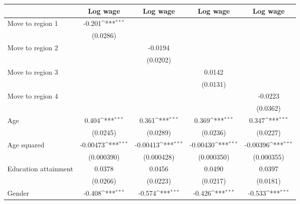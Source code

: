 {
\def\sym#1{\ifmmode^{#1}\else\(^{#1}\)\fi}
\begin{tabular*}{\textwidth}{@{\hskip\tabcolsep\extracolsep\fill}l*{4}{c}}
\toprule
                    &\multicolumn{1}{c}{Log wage}&\multicolumn{1}{c}{Log wage}&\multicolumn{1}{c}{Log wage}&\multicolumn{1}{c}{Log wage}\\
\midrule
Move to region 1    &      -0.201\sym{***}&                     &                     &                     \\
                    &    (0.0286)         &                     &                     &                     \\
\addlinespace
Move to region 2    &                     &     -0.0194         &                     &                     \\
                    &                     &    (0.0202)         &                     &                     \\
\addlinespace
Move to region 3    &                     &                     &      0.0142         &                     \\
                    &                     &                     &    (0.0131)         &                     \\
\addlinespace
Move to region 4    &                     &                     &                     &     -0.0223         \\
                    &                     &                     &                     &    (0.0362)         \\
\addlinespace
Age                 &       0.404\sym{***}&       0.361\sym{***}&       0.369\sym{***}&       0.347\sym{***}\\
                    &    (0.0245)         &    (0.0289)         &    (0.0236)         &    (0.0227)         \\
\addlinespace
Age squared         &    -0.00473\sym{***}&    -0.00413\sym{***}&    -0.00430\sym{***}&    -0.00396\sym{***}\\
                    &  (0.000390)         &  (0.000428)         &  (0.000350)         &  (0.000355)         \\
\addlinespace
Education attainment&      0.0378         &      0.0456         &      0.0490         &      0.0397         \\
                    &    (0.0266)         &    (0.0223)         &    (0.0217)         &    (0.0181)         \\
\addlinespace
Gender              &      -0.408\sym{***}&      -0.574\sym{***}&      -0.426\sym{***}&      -0.533\sym{***}\\

\end{tabular*}}
